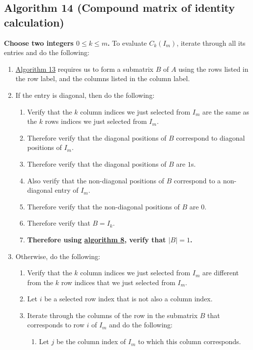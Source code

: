 \documentclass[twocolumn]{article}
\begin{document}
		\subsection{Algorithm 14 (Compound matrix of identity calculation)}\label{sec:algorithm 14}
			\textbf{Choose two integers $0\le k\le m$.} To evaluate $C_k(I_m)$, iterate through all its entries and do the following:
			\begin{enumerate}
				\item \hyperref[sec:algorithm 13]{Algorithm 13} requires us to form a submatrix $B$ of $A$ using the rows listed in the row label, and the columns listed in the column label.
				\item If the entry is diagonal, then do the following:
				\begin{enumerate}
					\item Verify that the $k$ column indices we just selected from $I_m$ are the same as the $k$ rows indices we just selected from $I_m$.
					\item Therefore verify that the diagonal positions of $B$ correspond to diagonal positions of $I_m$.
					\item Therefore verify that the diagonal positions of $B$ are $1$s.
					\item Also verify that the non-diagonal positions of $B$ correspond to a non-diagonal entry of $I_m$.
					\item Therefore verify that the non-diagonal positions of $B$ are $0$.
					\item Therefore verify that $B=I_k$.
					\item \textbf{Therefore using \hyperref[sec:algorithm 8]{algorithm 8}, verify that $\lvert B\rvert=1$.}
				\end{enumerate}
				\item Otherwise, do the following:
				\begin{enumerate}
					\item Verify that the $k$ column indices we just selected from $I_m$ are different from the $k$ row indices that we just selected from $I_m$.
					\item Let $i$ be a selected row index that is not also a column index.
					\item Iterate through the columns of the row in the submatrix $B$ that corresponds to row $i$ of $I_m$ and do the following:
					\begin{enumerate}
						\item Let $j$ be the column index of $I_m$ to which this column corresponds.

\end{enumerate}
\end{enumerate}
\end{enumerate}
\end{document}
